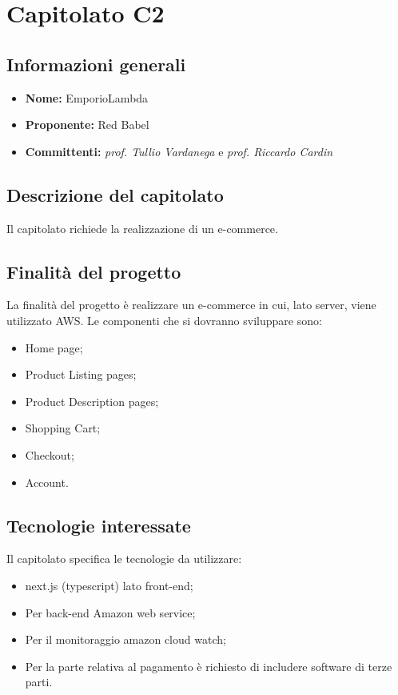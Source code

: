 \section{Capitolato C2}

\subsection{Informazioni generali}
\begin{itemize}
\item \textbf{Nome:} EmporioLambda
\item \textbf{Proponente:} Red Babel
\item \textbf{Committenti:} \textit{prof. Tullio Vardanega} e \textit{prof. Riccardo Cardin}
\end{itemize}

\subsection{Descrizione del capitolato}
Il capitolato richiede la realizzazione di un e-commerce.

\subsection{Finalità del progetto}
La finalità del progetto è realizzare un e-commerce in cui, lato server, viene utilizzato AWS. Le componenti che si dovranno sviluppare sono:
\begin{itemize}
\item Home page;
\item Product Listing pages;
\item Product Description pages;
\item Shopping Cart;
\item Checkout;
\item Account.
\end{itemize}

\subsection{Tecnologie interessate}
Il capitolato specifica le tecnologie da utilizzare:
\begin{itemize}
\item next.js (typescript) lato front-end;
\item Per back-end Amazon web service;
\item Per il monitoraggio amazon cloud watch;
\item Per la parte relativa al pagamento è richiesto di includere software di terze parti.
\end{itemize}


